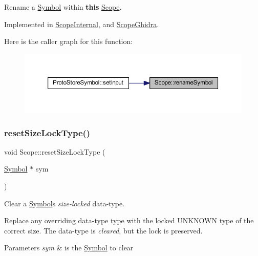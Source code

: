 Rename a \mbox{\hyperlink{class_symbol}{Symbol}} within {\bfseries{this}} \mbox{\hyperlink{class_scope}{Scope}}. 



Implemented in \mbox{\hyperlink{class_scope_internal_ada63ff8f4efed6fd4605441a0150ae6f}{Scope\+Internal}}, and \mbox{\hyperlink{class_scope_ghidra_af6476f25701e4bc419644bab003d5513}{Scope\+Ghidra}}.

Here is the caller graph for this function\+:
\nopagebreak
\begin{figure}[H]
\begin{center}
\leavevmode
\includegraphics[width=350pt]{class_scope_ab576de2e768be9507ee03faa163c1ddf_icgraph}
\end{center}
\end{figure}
\mbox{\label{class_scope_a4af52229967e3a507a5367e14a298142}} 
\subsubsection{\texorpdfstring{resetSizeLockType()}{resetSizeLockType()}}
{\footnotesize\ttfamily void Scope\+::reset\+Size\+Lock\+Type (\begin{DoxyParamCaption}\item[{\mbox{\hyperlink{class_symbol}{Symbol}} $\ast$}]{sym }\end{DoxyParamCaption})}



Clear a \mbox{\hyperlink{class_symbol}{Symbol}}\textquotesingle{}s {\itshape size-\/locked} data-\/type. 

Replace any overriding data-\/type type with the locked U\+N\+K\+N\+O\+WN type of the correct size. The data-\/type is {\itshape cleared}, but the lock is preserved. 
\begin{DoxyParams}{Parameters}
{\em sym} & is the \mbox{\hyperlink{class_symbol}{Symbol}} to clear \\
\hline
\end{DoxyParams}


